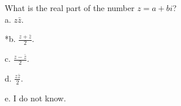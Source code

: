 
What is the real part of the number \(z = a + bi\)?\\

a. \(\)\(z\bar{z}\).

*b. \(\frac{z+\bar{z}}{2}\).

c. \(\frac{z-\bar{z}}{2}\).

d. \(\frac{z\bar{z}}{2}\).

e. I do not know.\\
